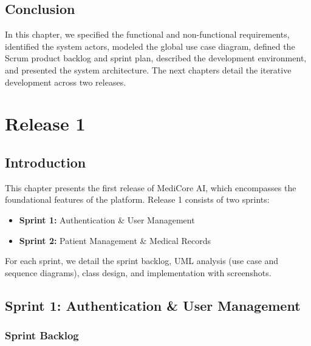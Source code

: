 \documentclass[12pt,a4paper,oneside]{report}
\begin{document}
\section{Conclusion}
In this chapter, we specified the functional and non-functional requirements, identified the system actors, modeled the global use case diagram, defined the Scrum product backlog and sprint plan, described the development environment, and presented the system architecture. The next chapters detail the iterative development across two releases.


\chapter{Release 1}

\section{Introduction}
This chapter presents the first release of MediCore AI, which encompasses the foundational features of the platform. Release 1 consists of two sprints:
\begin{itemize}
    \item \textbf{Sprint 1:} Authentication \& User Management
    \item \textbf{Sprint 2:} Patient Management \& Medical Records
\end{itemize}

For each sprint, we detail the sprint backlog, UML analysis (use case and sequence diagrams), class design, and implementation with screenshots.

\section{Sprint 1: Authentication \& User Management}

\subsection{Sprint Backlog}
\end{document}
